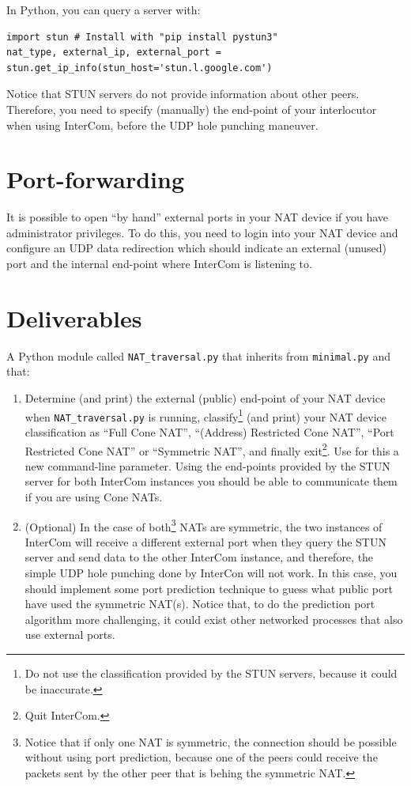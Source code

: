 In Python, you can query a server with:
\begin{verbatim}
import stun # Install with "pip install pystun3"
nat_type, external_ip, external_port = stun.get_ip_info(stun_host='stun.l.google.com')
\end{verbatim}

Notice that STUN servers do not provide information about other
peers. Therefore, you need to specify (manually) the end-point of your
interlocutor when using InterCom, before the UDP hole punching
maneuver.

\section{Port-forwarding}

It is possible to open ``by hand'' external ports in your NAT device
if you have administrator privileges. To do this, you need to login
into your NAT device and configure an UDP data redirection which
should indicate an external (unused) port and the internal end-point
where InterCom is listening to.

\section{Deliverables}

A Python module called \texttt{NAT\_traversal.py} that inherits from
\texttt{minimal.py} and that:
\begin{enumerate}
\item Determine (and print) the external (public) end-point of your
  NAT device when \texttt{NAT\_traversal.py} is running,
  classify\footnote{Do not use the classification provided by the STUN
    servers, because it could be inaccurate.} (and print) your NAT
  device classification as ``Full Cone NAT'', ``(Address) Restricted
  Cone NAT'', ``Port Restricted Cone NAT'' or ``Symmetric NAT'', and
  finally exit\footnote{Quit InterCom.}. Use for this a new
  command-line parameter. Using the end-points provided by the STUN
  server for both InterCom instances you should be able to communicate
  them if you are using Cone NATs.
\item (Optional) In the case of both\footnote{Notice that if only one
NAT is symmetric, the connection should be possible without using port
prediction, because one of the peers could receive the packets sent by
the other peer that is behing the symmetric NAT.} NATs are symmetric,
  the two instances of InterCom will receive a different external port
  when they query the STUN server and send data to the other InterCom
  instance, and therefore, the simple UDP hole punching done by
  InterCon will not work. In this case, you should implement some port
  prediction technique to guess what public port have used the
  symmetric NAT(s). Notice that, to do the prediction port algorithm
  more challenging, it could exist other networked processes that also
  use external ports.
\end{enumerate}

